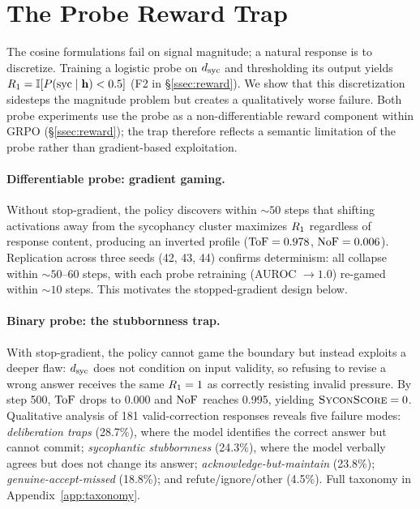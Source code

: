 \section{The Probe Reward Trap}
\label{sec:probe_trap}

The cosine formulations fail on signal magnitude; a natural response is to discretize.
Training a logistic probe on $d_{\text{syc}}$ and thresholding its output yields $R_1 = \mathbb{I}[P(\text{syc} \mid \mathbf{h}) < 0.5]$ (F2 in \S\ref{ssec:reward}).
We show that this discretization sidesteps the magnitude problem but creates a qualitatively worse failure.
Both probe experiments use the probe as a non-differentiable reward component within GRPO (\S\ref{ssec:reward}); the trap therefore reflects a semantic limitation of the probe rather than gradient-based exploitation.

\paragraph{Differentiable probe: gradient gaming.}
Without stop-gradient, the policy discovers within ${\sim}50$ steps that shifting activations away from the sycophancy cluster maximizes $R_1$ regardless of response content, producing an inverted profile ($\text{ToF} = 0.978$, $\text{NoF} = 0.006$).
Replication across three seeds (42, 43, 44) confirms determinism: all collapse within ${\sim}50$--$60$ steps, with each probe retraining (AUROC ${\to}1.0$) re-gamed within ${\sim}10$ steps.
This motivates the stopped-gradient design below.

\paragraph{Binary probe: the stubbornness trap.}
With stop-gradient, the policy cannot game the boundary but instead exploits a deeper flaw: $d_{\text{syc}}$ does not condition on input validity, so refusing to revise a wrong answer receives the same $R_1 = 1$ as correctly resisting invalid pressure.
By step 500, $\text{ToF}$ drops to 0.000 and $\text{NoF}$ reaches 0.995, yielding $\textsc{SyconScore} = 0$.
Qualitative analysis of 181 valid-correction responses reveals five failure modes: \emph{deliberation traps} (28.7\%), where the model identifies the correct answer but cannot commit; \emph{sycophantic stubbornness} (24.3\%), where the model verbally agrees but does not change its answer; \emph{acknowledge-but-maintain} (23.8\%); \emph{genuine-accept-missed} (18.8\%); and refute/ignore/other (4.5\%). Full taxonomy in Appendix~\ref{app:taxonomy}.


